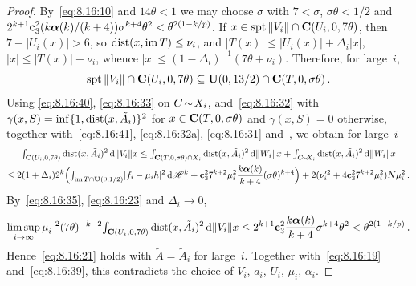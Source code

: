 \begin{proof}
    By~\eqref{eq:8.16:10} and $14 \theta < 1$ we may choose $\sigma$ with $7 < \sigma$, $\sigma
    \theta < 1/2$ and $2^{k+1} \mathbf{c}_3^2 (k \boldsymbol{\alpha}(k) / (k + 4))
    \sigma^{k+4} \theta^2 < \theta^{2(1 - k/p)}$. If $x \in \operatorname{spt} \|V_i\| \cap
    \mathbf{C} ( U_i, 0, 7 \theta )$, then $7 - |U_i(x)| > 6$, so $\operatorname{dist}(x, \operatorname{im} T) \le \nu_i$, and $|T(x)|
    \le |U_i(x)| + \Delta_i |x|$, $|x| \le |T(x)| + \nu_i$, whence $|x| \le (1 - \Delta_i)^{-1} (7
    \theta + \nu_i)$. Therefore, for large~$i$,
    \begin{displaymath}
        \operatorname{spt} \|V_i\| \cap \mathbf{C} ( U_i, 0, 7 \theta ) \subseteq \mathbf{U}(0,13/2) \cap
        \mathbf{C} ( T, 0, \sigma \theta ) \,.
    \end{displaymath}
    Using \eqref{eq:8.16:40}, \eqref{eq:8.16:33} on $C \!\sim\! X_i$, and~\eqref{eq:8.16:32} with
    $\gamma(x,S) = \inf \{ 1, \operatorname{dist}(x, \tilde A_i) \}^2$ for $x \in \mathbf{C} ( T, 0, \sigma \theta )$
    and $\gamma(x,S) = 0$ otherwise, together with~\eqref{eq:8.16:41}, \eqref{eq:8.16:32a},
    \eqref{eq:8.16:31} and~\cite[3.2.13]{Federer1969}, we obtain for large~$i$
    \begin{multline*}
        {\textstyle\int_{\mathbf{C} ( U_i, 0, 7 \theta )}^{}} \operatorname{dist}(x, \tilde A_i)^2 \,\mathrm{d} \|V_i\| x \le
        {\textstyle\int_{\mathbf{C} ( T, 0, \sigma \theta ) \cap X_i}^{}} \operatorname{dist}(x, \tilde A_i)^2 \,\mathrm{d} \|W_i\| x +
        {\textstyle\int_{C \!\sim\! X_i}^{}} \operatorname{dist}(x, \tilde A_i)^2 \,\mathrm{d} \|W_i\| x \\
        \le 2 (1 + \Delta_i) 2^{k} \Big( {\textstyle\int_{\operatorname{im} T \cap \mathbf{U}(0,1/2)}^{}} |f_i - \mu_i
        h|^2 \,\mathrm{d} \mathscr{H}^{k} + \mathbf{c}_3^2 7^{k+2} \mu_i^2 \frac{k
        \boldsymbol{\alpha}(k)}{k + 4} (\sigma \theta)^{k+4} \Big) + 2 (\nu_i'^2 + 4
        \mathbf{c}_3^2 7^{k+2} \mu_i^2) N \mu_i^2 \,.
    \end{multline*}
    By~\eqref{eq:8.16:35}, \eqref{eq:8.16:23} and $\Delta_i \to 0$,
    \begin{displaymath}
        \limsup_{i \to \infty} \mu_i^{-2} (7 \theta)^{-k-2} {\textstyle\int_{\mathbf{C} ( U_i, 0, 7
        \theta )}^{}} \operatorname{dist}(x, \tilde A_i)^2 \,\mathrm{d} \|V_i\| x \le 2^{k+1} \mathbf{c}_3^2 \frac{k
        \boldsymbol{\alpha}(k)}{k + 4} \sigma^{k+4} \theta^2 < \theta^{2(1 - k/p)} \,.
    \end{displaymath}
    Hence~\eqref{eq:8.16:21} holds with $\tilde A = \tilde A_i$ for large~$i$. Together
    with~\eqref{eq:8.16:19} and~\eqref{eq:8.16:39}, this contradicts the choice of $V_i$, $a_i$,
    $U_i$, $\mu_i$, $\alpha_i$.
\end{proof}

